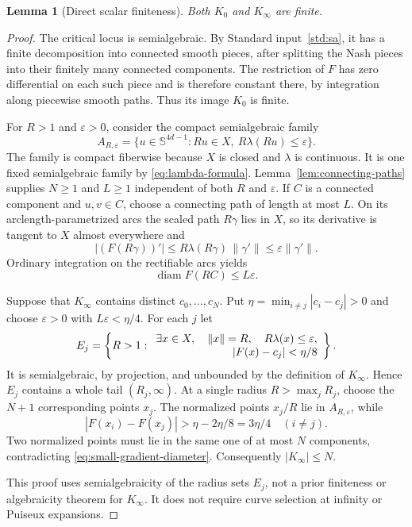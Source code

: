 \documentclass[11pt]{article}
\numberwithin{equation}{section}
\newtheorem{lemma}[theorem]{Lemma}
\theoremstyle{definition}
\theoremstyle{remark}
\begin{document}
\begin{lemma}[Direct scalar finiteness]\label{lem:scalar-finiteness}
Both $K_0$ and $K_\infty$ are finite.
\end{lemma}
\begin{proof}
The critical locus is semialgebraic. By Standard input~\ref{std:sa},
it has a finite decomposition into connected smooth pieces, after
splitting the Nash pieces into their finitely many connected components.
The restriction of $F$ has zero differential on each such piece and is
therefore constant there, by integration along piecewise smooth paths.
Thus its image $K_0$ is finite.

For $R>1$ and $\varepsilon>0$, consider the compact semialgebraic family
\begin{equation}\label{eq:small-gradient-sphere}
 A_{R,\varepsilon}=
 \{u\in\mathbb S^{4d-1}:Ru\in X,\ R\lambda(Ru)\le\varepsilon\}.
\end{equation}
The family is compact fiberwise because $X$ is closed and $\lambda$
is continuous. It is one fixed semialgebraic family by
\eqref{eq:lambda-formula}. Lemma~\ref{lem:connecting-paths} supplies
$N\ge1$ and $L\ge1$ independent of both $R$ and $\varepsilon$.
If $C$ is a connected component and $u,v\in C$, choose a connecting
path of length at most $L$. On its arclength-parametrized arcs the
scaled path $R\gamma$ lies in $X$, so its derivative is tangent to $X$
almost everywhere and
\[
 |(F(R\gamma))'|
 \le R\lambda(R\gamma)\,\|\gamma'\|
 \le\varepsilon\|\gamma'\|.
\]
Ordinary integration on the rectifiable arcs yields
\begin{equation}\label{eq:small-gradient-diameter}
 \operatorname{diam}F(RC)\le L\varepsilon.
\end{equation}

Suppose that $K_\infty$ contains distinct $c_0,\ldots,c_N$. Put
$\eta=\min_{i\ne j}|c_i-c_j|>0$ and choose
$\varepsilon>0$ with $L\varepsilon<\eta/4$. For each $j$ let
\begin{equation}\label{eq:common-radius-set}
 E_j=\left\{R>1:
 \begin{array}{l}
 \exists x\in X,\quad\|x\|=R,\quad R\lambda(x)\le\varepsilon,\\
 \hfill |F(x)-c_j|<\eta/8
 \end{array}\right\}.
\end{equation}
It is semialgebraic, by projection, and unbounded by the definition
of $K_\infty$. Hence $E_j$ contains a whole tail $(R_j,\infty)$.
At a single radius $R>\max_jR_j$, choose the $N+1$ corresponding
points $x_j$. The normalized points $x_j/R$ lie in
$A_{R,\varepsilon}$, while
\[
 |F(x_i)-F(x_j)|>\eta-2\eta/8=3\eta/4\quad(i\ne j).
\]
Two normalized points must lie in the same one of at most $N$
components, contradicting \eqref{eq:small-gradient-diameter}.
Consequently $|K_\infty|\le N$.

This proof uses semialgebraicity of the radius sets $E_j$, not a prior
finiteness or algebraicity theorem for $K_\infty$. It does not require
curve selection at infinity or Puiseux expansions.
\end{proof}
\end{document}
